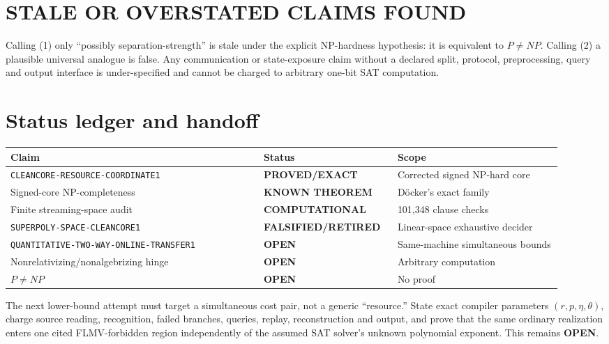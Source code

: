 \documentclass[11pt]{article}
\newcommand{\EXACT}{\textbf{PROVED/EXACT}}
\newcommand{\KNOWN}{\textbf{KNOWN THEOREM}}
\newcommand{\COMP}{\textbf{COMPUTATIONAL}}
\newcommand{\OPEN}{\textbf{OPEN}}
\newcommand{\RETIRED}{\textbf{FALSIFIED/RETIRED}}
\begin{document}
\section{STALE OR OVERSTATED CLAIMS FOUND}

Calling (1) only ``possibly separation-strength'' is stale under the explicit
NP-hardness hypothesis: it is equivalent to $P\ne NP$.  Calling (2) a
plausible universal analogue is false.  Any communication or state-exposure
claim without a declared split, protocol, preprocessing, query and output
interface is under-specified and cannot be charged to arbitrary one-bit SAT
computation.

\section{Status ledger and handoff}

\begin{center}\scriptsize
\begin{tabular}{@{}p{0.43\linewidth}p{0.20\linewidth}p{0.29\linewidth}@{}}
\toprule
Claim & Status & Scope\\ \midrule
\texttt{CLEANCORE-RESOURCE-COORDINATE1} & \EXACT & Corrected signed NP-hard core\\
Signed-core NP-completeness & \KNOWN & D\"ocker's exact family\\
Finite streaming-space audit & \COMP & 101,348 clause checks\\
\texttt{SUPERPOLY-SPACE-CLEANCORE1} & \RETIRED & Linear-space exhaustive decider\\
\texttt{QUANTITATIVE-TWO-WAY-ONLINE-TRANSFER1} & \OPEN & Same-machine simultaneous bounds\\
Nonrelativizing/nonalgebrizing hinge & \OPEN & Arbitrary computation\\
$P\ne NP$ & \OPEN & No proof\\
\bottomrule
\end{tabular}
\end{center}

The next lower-bound attempt must target a simultaneous cost pair, not a
generic ``resource.''  State exact compiler parameters $(r,p,\eta,\theta)$,
charge source reading, recognition, failed branches, queries, replay,
reconstruction and output, and prove that the same ordinary realization
enters one cited FLMV-forbidden region independently of the assumed SAT
solver's unknown polynomial exponent.  This remains \OPEN.
\end{document}
